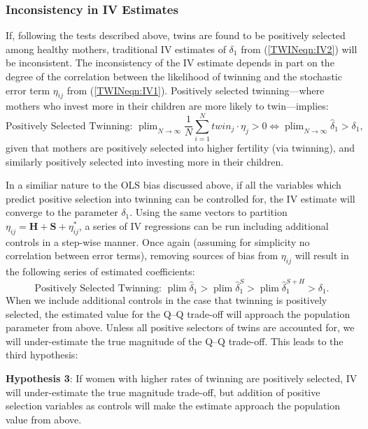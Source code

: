 \documentclass[subeqn]{article}
\DeclareMathOperator{\plim}{plim}
\begin{document}
\begin{spacing}{1.4}
\subsubsection{Inconsistency in IV Estimates}
If, following the tests described above, twins are found to be positively selected
among healthy mothers, traditional IV estimates of $\delta_1$ from (\ref{TWINeqn:IV2})
will be inconsistent.  The inconsistency of the IV estimate depends in part on the
degree of the correlation between the likelihood of twinning and the stochastic error
term $\eta_{ij}$ from (\ref{TWINeqn:IV1}).  Positively selected twinning---where
mothers who invest more in their children are more likely to twin---implies:
\begin{equation}
  \text{Positively Selected Twinning:\ \ \ }  \plim_{N\rightarrow\infty} \frac{1}{N}\sum_{i=1}^Ntwin_j\cdot \eta_j > 0 \Leftrightarrow \plim_{N\rightarrow\infty}\hat\delta_1 > \delta_1, \nonumber
\end{equation}
given that mothers are positively selected into higher fertility (via twinning),
and similarly positively selected into investing more in their children.

In a similiar nature to the OLS bias discussed above, if all the variables
which predict positive selection into twinning can be controlled for, the
IV estimate will converge to the parameter $\delta_1$.  Using the same vectors
to partition $\eta_{ij}=\bm{H}+\bm{S}+\eta^*_{ij}$, a series of IV regressions
can be run including additional controls in a step-wise manner.  Once again
(assuming for simplicity no correlation between error terms), removing sources
of bias from $\eta_{ij}$ will result in the following series of estimated
coefficients:
\begin{equation}
  \text{Positively Selected Twinning:\ \ \ } \plim \hat\delta_1 > \plim\hat\delta_1^{S} > \plim\hat\delta_1^{S+H} > \delta_1. \nonumber
\end{equation}
When we include additional controls in the case that twinning is positively
selected, the estimated value for the Q--Q trade-off will approach the population
parameter from above.  Unless all positive selectors of twins are
accounted for, we will under-estimate the true magnitude of the Q--Q trade-off.
This leads to the third hypothesis:

\noindent \textbf{Hypothesis 3}: If women with higher rates of twinning are
positively selected, IV will under-estimate the true magnitude trade-off, but
addition of positive selection variables as controls will make the estimate
approach the population value from above.



\end{spacing}
\end{document}
